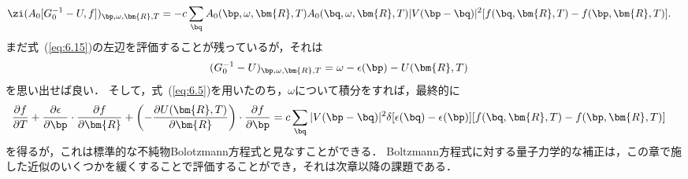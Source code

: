 \documentclass[a4paper,10pt]{jsarticle}
\begin{document}
\begin{align}
\zi (A_0 [G_0^{-1} - U, f])_{\bp, \omega, \bm{R}, T}
	& = - c \sum_{\bq} A_0 (\bp, \omega, \bm{R}, T) A_0 (\bq, \omega, \bm{R}, T)
		| V (\bp - \bq) |^2 [ f (\bq, \bm{R}, T) - f (\bp, \bm{R}, T) ]
\label{eq:6.15}
.\end{align}
まだ式~(\ref{eq:6.15})の左辺を評価することが残っているが，それは
\begin{align}
(G_0^{-1} - U)_{\bp, \omega, \bm{R}, T}
	& = \omega - \epsilon (\bp) - U (\bm{R}, T)
\end{align}
を思い出せば良い．
そして，式~(\ref{eq:6.5})を用いたのち，$\omega$について積分をすれば，最終的に
\begin{align}
\frac{\partial f}{\partial T}
	+ \frac{\partial \epsilon}{\partial \bp} \cdot \frac{\partial f}{\partial \bm{R}}
	+ \left( - \frac{\partial U (\bm{R}, T)}{\partial \bm{R}} \right) \cdot \frac{\partial f}{\partial \bp}
	& = c \sum_{\bq} | V (\bp - \bq) |^2 \delta[ \epsilon (\bq) - \epsilon (\bp) ] [ f (\bq, \bm{R}, T) - f (\bp, \bm{R}, T) ]
\end{align}
を得るが，これは標準的な不純物Bolotzmann方程式と見なすことができる．
Boltzmann方程式に対する量子力学的な補正は，この章で施した近似のいくつかを緩くすることで評価することができ，それは次章以降の課題である．






%
\end{document}
